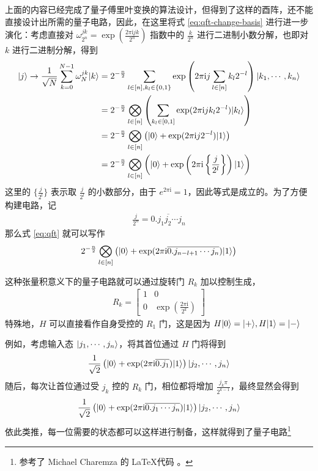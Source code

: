 \documentclass[a4paper,11pt,onecolumn,twoside]{article}
\begin{document}
上面的内容已经完成了量子傅里叶变换的算法设计，但得到了这样的酉阵，还不能直接设计出所需的量子电路，因此，在这里将式 \ref{eq:qft-change-basis} 进行进一步演化：考虑直接对 $\omega_{2^n}^{jk}=\exp(\frac{2\pi\mathrm{i} jk}{2^n})$ 指数中的 $\frac{k}{2^n}$ 进行二进制小数分解，也即对 $k$ 进行二进制分解，得到 \begin{align}\begin{aligned}
        |j\rangle\to\frac{1}{\sqrt{N}}\sum_{k=0}^{N-1}\omega_N^{jk}|k\rangle
         & =2^{-\frac{n}{2}}\sum_{l\in[n],k_l\in\{0,1\}}\exp\left(2\pi\mathrm{i} j\sum_{l\in[n]}k_l2^{-l}\right)|k_1,\cdots,k_n\rangle                  \\
         & =2^{-\frac{n}{2}}\bigotimes_{l\in[n]}\left(\sum_{k_l\in[0,1]}\exp(2\pi\mathrm{i} jk_l2^{-l})|k_l\rangle\right)                               \\
         & =2^{-\frac{n}{2}}\bigotimes_{l\in[n]}\left(|0\rangle+\exp(2\pi\mathrm{i} j2^{-l})|1\rangle\right)                                              \\
         & =2^{-\frac{n}{2}}\bigotimes_{l\in[n]}\left(|0\rangle+\exp\left(2\pi\mathrm{i}\left\{\frac{j}{2^l}\right\}\right)|1\rangle\right)\label{eq:qft}
    \end{aligned}\end{align}
这里的 $\{\frac{j}{2^l}\}$ 表示取 $\frac{j}{2^l}$ 的小数部分，由于 $e^{2\pi\mathrm{i}}=1$，因此等式是成立的。为了方便构建电路，记 \begin{align}
    \frac{j}{2^n}=\overline{0.j_1 j_2\cdots j_n}
\end{align}
那么式 \ref{eq:qft} 就可以写作 \begin{align*}
    2^{-\frac{n}{2}}\bigotimes_{l\in[n]}\left(|0\rangle+\exp(2\pi\mathrm{i}\overline{0.j_{n-l+1}\cdots j_{n}})|1\rangle\right)
\end{align*}

这种张量积意义下的量子电路就可以通过旋转门 $R_k$ 加以控制生成，\begin{align}
    R_k=\begin{bmatrix}
            1 & 0                                           \\
            0 & \exp\left(\frac{2\pi\mathrm{i}}{2^k}\right)
        \end{bmatrix}
\end{align}
特殊地，$H$ 可以直接看作自身受控的 $R_1$ 门，这是因为 $H|0\rangle=|+\rangle,H|1\rangle=|-\rangle$

例如，考虑输入态 $|j_1,\cdots,j_n\rangle$，将其首位通过 $H$ 门将得到 \begin{align}
    \frac{1}{\sqrt{2}}\left(|0\rangle+\exp(2\pi\mathrm{i}\overline{0.j_1})|1\rangle\right)|j_2,\cdots,j_n\rangle
\end{align}
随后，每次让首位通过受 $j_k$ 控的 $R_k$ 门，相位都将增加 $\frac{j_k\pi}{2^{k-1}}$，最终显然会得到 \begin{align}
    \frac{1}{\sqrt{2}}\left(|0\rangle+\exp(2\pi\mathrm{i}\overline{0.j_1\cdots j_n})|1\rangle\right)|j_2,\cdots,j_n\rangle
\end{align}
依此类推，每一位需要的状态都可以这样进行制备，这样就得到了量子电路\footnote{参考了 Michael Charemza 的 \LaTeX 代码 \cite{charemza2006examples}。}
\end{document}
